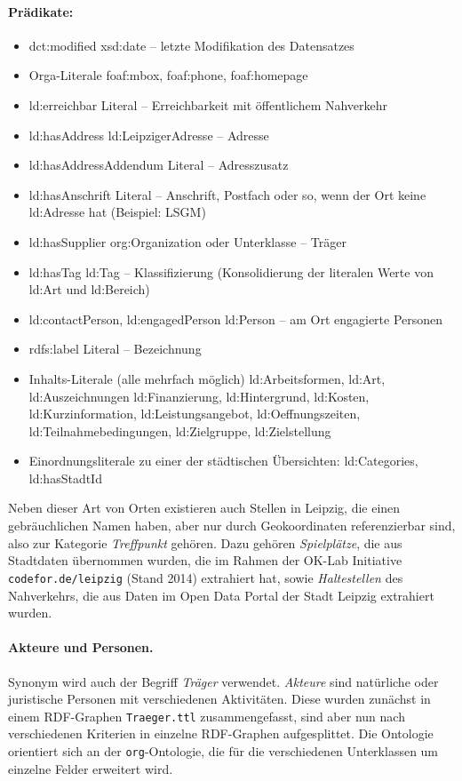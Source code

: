 \documentclass[a4paper,11pt]{article}
\begin{document}
\paragraph{Prädikate:}
\begin{itemize}\itemsep0pt
\item dct:modified xsd:date – letzte Modifikation des Datensatzes
\item Orga-Literale foaf:mbox, foaf:phone, foaf:homepage
\item ld:erreichbar Literal – Erreichbarkeit mit öffentlichem Nahverkehr
\item ld:hasAddress ld:LeipzigerAdresse – Adresse
\item ld:hasAddressAddendum Literal – Adresszusatz
\item ld:hasAnschrift Literal – Anschrift, Postfach oder so, wenn der Ort
  keine ld:Adresse hat (Beispiel: LSGM)
\item ld:hasSupplier org:Organization oder Unterklasse – Träger
\item ld:hasTag ld:Tag – Klassifizierung (Konsolidierung der literalen Werte
  von ld:Art und ld:Bereich)
\item ld:contactPerson, ld:engagedPerson ld:Person – am Ort engagierte
  Personen
\item rdfs:label Literal – Bezeichnung
\item Inhalts-Literale (alle mehrfach möglich) ld:Arbeitsformen, ld:Art,
  ld:Auszeichnungen ld:Finanzierung, ld:Hintergrund, ld:Kosten,
  ld:Kurzinformation, ld:Leistungsangebot, ld:Oeffnungszeiten,
  ld:Teilnahmebedingungen, ld:Zielgruppe, ld:Zielstellung
\item Einordnungsliterale zu einer der städtischen Übersichten: ld:Categories,
  ld:hasStadtId
\end{itemize}

Neben dieser Art von Orten existieren auch Stellen in Leipzig, die einen
gebräuchlichen Namen haben, aber nur durch Geokoordinaten referenzierbar sind,
also zur Kategorie \emph{Treffpunkt} gehören. Dazu gehören \emph{Spielplätze},
die aus Stadtdaten übernommen wurden, die im Rahmen der OK-Lab Initiative
\texttt{codefor.de/leipzig} (Stand 2014) extrahiert hat, sowie
\emph{Haltestellen} des Nahverkehrs, die aus Daten im Open Data Portal der
Stadt Leipzig extrahiert wurden. 

\paragraph{Akteure und Personen.} 
Synonym wird auch der Begriff \emph{Träger} verwendet. \emph{Akteure} sind
natürliche oder juristische Personen mit verschiedenen Aktivitäten. Diese
wurden zunächst in einem RDF-Graphen \texttt{Traeger.ttl} zusammengefasst,
sind aber nun nach verschiedenen Kriterien in einzelne RDF-Graphen
aufgesplittet.  Die Ontologie orientiert sich an der \texttt{org}-Ontologie,
die für die verschiedenen Unterklassen um einzelne Felder erweitert wird.
\end{document}
